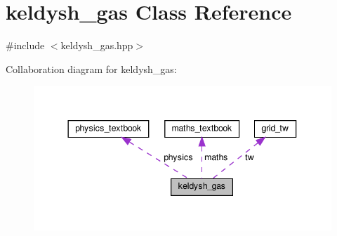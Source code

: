 \hypertarget{classkeldysh__gas}{}\section{keldysh\+\_\+gas Class Reference}
\label{classkeldysh__gas}


{\ttfamily \#include $<$keldysh\+\_\+gas.\+hpp$>$}



Collaboration diagram for keldysh\+\_\+gas\+:\nopagebreak
\begin{figure}[H]
\begin{center}
\leavevmode
\includegraphics[width=344pt]{classkeldysh__gas__coll__graph}
\end{center}
\end{figure}
